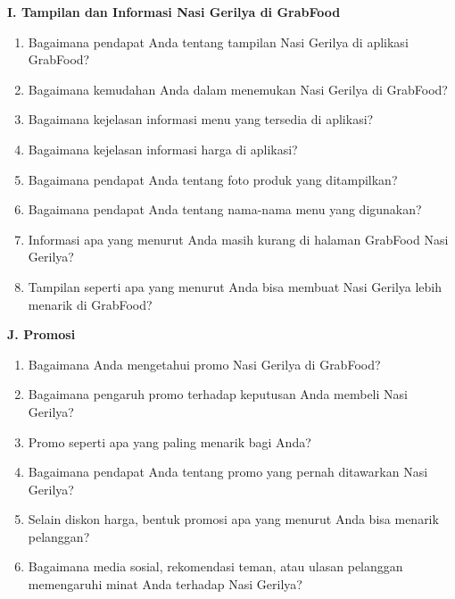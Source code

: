 \documentclass[10pt,a4paper]{article}
\newcommand{\sectionbar}[1]{%
  \Needspace{5\baselineskip}
  \vspace{4mm}
  \noindent\colorbox{Soft}{%
    \parbox{\dimexpr\linewidth-2\fboxsep\relax}{%
      \large\bfseries\textcolor{Primary}{#1}
    }%
  }\par\vspace{1mm}
}
\newcommand{\probe}[1]{%
  \vspace{1mm}
  \noindent{\small\textbf{\textcolor{Accent}{Probing:}} \textcolor{TextGray}{#1}}\par
}
\begin{document}
\sectionbar{I. Tampilan dan Informasi Nasi Gerilya di GrabFood}
\begin{enumerate}[label=\arabic*.,leftmargin=*,itemsep=1.2mm,resume]
\item Bagaimana pendapat Anda tentang tampilan Nasi Gerilya di aplikasi GrabFood?
\item Bagaimana kemudahan Anda dalam menemukan Nasi Gerilya di GrabFood?
\item Bagaimana kejelasan informasi menu yang tersedia di aplikasi?
\item Bagaimana kejelasan informasi harga di aplikasi?
\item Bagaimana pendapat Anda tentang foto produk yang ditampilkan?
\item Bagaimana pendapat Anda tentang nama-nama menu yang digunakan?
\item Informasi apa yang menurut Anda masih kurang di halaman GrabFood Nasi Gerilya?
\item Tampilan seperti apa yang menurut Anda bisa membuat Nasi Gerilya lebih menarik di GrabFood?
\end{enumerate}
\probe{Minta contoh informasi yang menurut informan perlu ditambahkan di halaman menu.}

\sectionbar{J. Promosi}
\begin{enumerate}[label=\arabic*.,leftmargin=*,itemsep=1.2mm,resume]
\item Bagaimana Anda mengetahui promo Nasi Gerilya di GrabFood?
\item Bagaimana pengaruh promo terhadap keputusan Anda membeli Nasi Gerilya?
\item Promo seperti apa yang paling menarik bagi Anda?
\item Bagaimana pendapat Anda tentang promo yang pernah ditawarkan Nasi Gerilya?
\item Selain diskon harga, bentuk promosi apa yang menurut Anda bisa menarik pelanggan?
\item Bagaimana media sosial, rekomendasi teman, atau ulasan pelanggan memengaruhi minat Anda terhadap Nasi Gerilya?
\end{enumerate}
\probe{Gali promo yang paling diingat dan apakah promo membuat informan melakukan pembelian ulang.}
\end{document}
